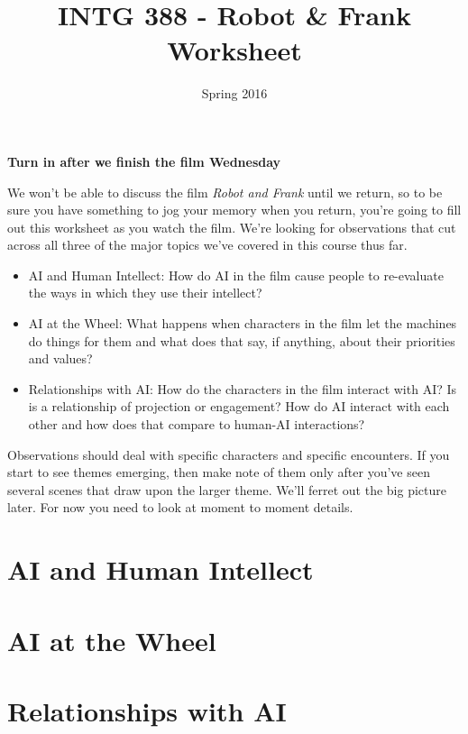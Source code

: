 \documentclass[nobib]{tufte-handout}
\title{INTG 388 - Robot \& Frank Worksheet}
\author{}
\date{ Spring 2016 }
\begin{document}
\maketitle
\thispagestyle{empty} 

\begin{center}
\textbf{Turn in after we finish the film Wednesday}
\end{center}

We won't be able to discuss the film \textit{Robot and Frank} until we return, so to be sure you have something to jog your memory when you return, you're going to fill out this worksheet as you watch the film. We're looking for observations that cut across all three of the major topics we've covered in this course thus far.

\begin{itemize}
\item AI and Human Intellect:  How do AI in the film cause people to re-evaluate the ways in which they use their intellect?
\item AI at the Wheel: What happens when characters in the film let the machines do things for them and what does that say, if anything, about their priorities and values? 
\item Relationships with AI: How do the characters in the film interact with AI? Is is a relationship of projection or engagement? How do AI interact with each other and how does that compare to human-AI interactions?
\end{itemize}

Observations should deal with specific characters and specific encounters. If you start to see themes emerging, then make note of them only after you've seen several scenes that draw upon the larger theme. We'll ferret out the big picture later.  For now you need to look at moment to moment details.

\newpage \thispagestyle{empty} 
\section*{AI and Human Intellect}
\newpage \thispagestyle{empty} 
\section*{AI at the Wheel}
\newpage \thispagestyle{empty} 
\section*{Relationships with AI}
\end{document}
